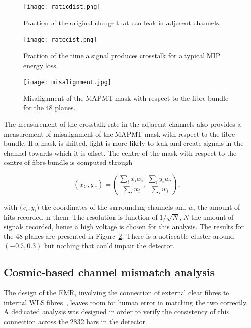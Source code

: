 \documentclass[a4paper,11pt]{article}
\begin{document}
\begin{figure}[htr!]
  \begin{minipage}[b]{.45\textwidth}
   \centering
   \texttt{[image: ratiodist.png]}
   \caption{Fraction of the original charge that can leak in adjacent channels.}
   \label{fig:ratio_dist}
  \end{minipage}
  \hspace{3mm}
  \begin{minipage}[b]{.45\textwidth}
   \centering
   \texttt{[image: ratedist.png]}
   \caption{Fraction of the time a signal produces crosstalk for a typical MIP energy loss.}
   \label{fig:rate_dist}
  \end{minipage}
\end{figure}

\begin{figure}[htr!]
   \centering
   \texttt{[image: misalignment.jpg]}
   \caption{Misalignment of the MAPMT mask with respect to the fibre bundle for the 48 planes.}
   \label{fig:misalignment}
\end{figure}

The measurement of the crosstalk rate in the adjacent channels also provides a measurement of misalignment of the MAPMT mask with respect to the fibre bundle.
If a mask is shifted, light is more likely to leak and create signals in the channel towards which it is offset. The centre of the mask with respect to the
centre of fibre bundle is computed through

\begin{equation}
(x_C,y_C)=\left(\frac{\sum_ix_iw_i}{\sum_iw_i},\frac{\sum_iy_iw_i}{\sum_iw_i}\right),
\end{equation}

with ($x_i,y_i$) the coordinates of the surrounding channels and $w_i$ the amount of hits recorded in them. The resolution is function of $1/\sqrt{N}$, $N$
the amount of signals recorded, hence a high voltage is chosen for this analysis. The results for the 48 planes are presented in Figure~\ref{fig:misalignment}.
There is a noticeable cluster around $(-0.3,0.3)$ but nothing that could impair the detector.

\subsection{Cosmic-based channel mismatch analysis}\label{sec:ch_mismatch}

The design of the EMR, involving the connection of external clear fibres to internal WLS fibres~\cite{emr_design_change}, leaves room for human error in matching the two correctly.
A dedicated analysis was designed in order to verify the consistency of this connection across the 2832 bars in the detector. 
\end{document}
